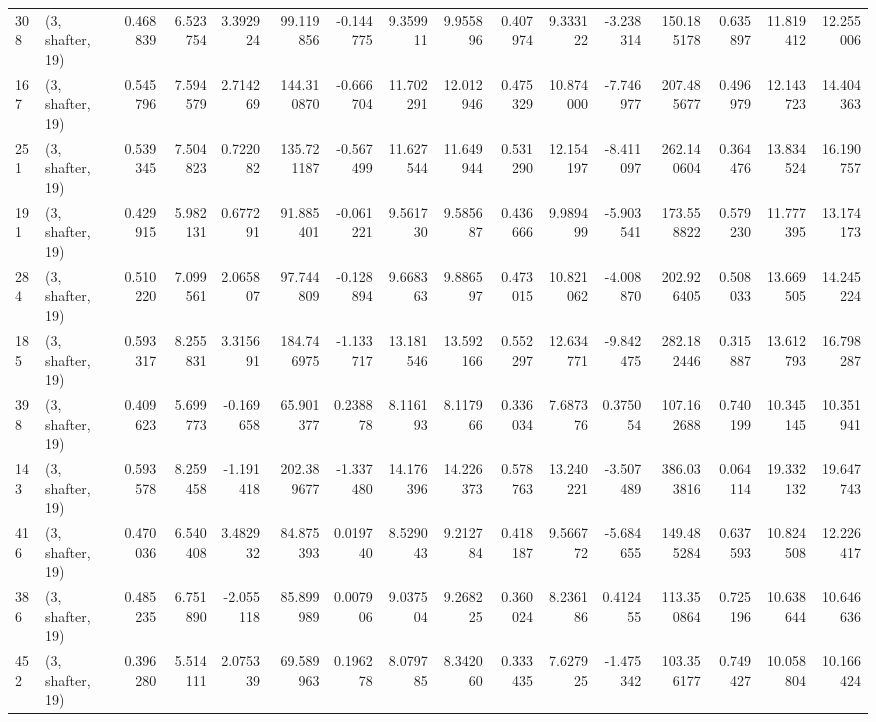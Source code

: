 \begin{tabular}{llrrrrrrrrrrrrrr}
308 &  (3, shafter, 19) &   0.468839 &   6.523754 &   3.392924 &    99.119856 &  -0.144775 &   9.359911 &   9.955896 &  0.407974 &   9.333122 &  -3.238314 &    150.185178 &    0.635897 &   11.819412 &   12.255006 \\
167 &  (3, shafter, 19) &   0.545796 &   7.594579 &   2.714269 &   144.310870 &  -0.666704 &  11.702291 &  12.012946 &  0.475329 &  10.874000 &  -7.746977 &    207.485677 &    0.496979 &   12.143723 &   14.404363 \\
251 &  (3, shafter, 19) &   0.539345 &   7.504823 &   0.722082 &   135.721187 &  -0.567499 &  11.627544 &  11.649944 &  0.531290 &  12.154197 &  -8.411097 &    262.140604 &    0.364476 &   13.834524 &   16.190757 \\
191 &  (3, shafter, 19) &   0.429915 &   5.982131 &   0.677291 &    91.885401 &  -0.061221 &   9.561730 &   9.585687 &  0.436666 &   9.989499 &  -5.903541 &    173.558822 &    0.579230 &   11.777395 &   13.174173 \\
284 &  (3, shafter, 19) &   0.510220 &   7.099561 &   2.065807 &    97.744809 &  -0.128894 &   9.668363 &   9.886597 &  0.473015 &  10.821062 &  -4.008870 &    202.926405 &    0.508033 &   13.669505 &   14.245224 \\
185 &  (3, shafter, 19) &   0.593317 &   8.255831 &   3.315691 &   184.746975 &  -1.133717 &  13.181546 &  13.592166 &  0.552297 &  12.634771 &  -9.842475 &    282.182446 &    0.315887 &   13.612793 &   16.798287 \\
398 &  (3, shafter, 19) &   0.409623 &   5.699773 &  -0.169658 &    65.901377 &   0.238878 &   8.116193 &   8.117966 &  0.336034 &   7.687376 &   0.375054 &    107.162688 &    0.740199 &   10.345145 &   10.351941 \\
143 &  (3, shafter, 19) &   0.593578 &   8.259458 &  -1.191418 &   202.389677 &  -1.337480 &  14.176396 &  14.226373 &  0.578763 &  13.240221 &  -3.507489 &    386.033816 &    0.064114 &   19.332132 &   19.647743 \\
416 &  (3, shafter, 19) &   0.470036 &   6.540408 &   3.482932 &    84.875393 &   0.019740 &   8.529043 &   9.212784 &  0.418187 &   9.566772 &  -5.684655 &    149.485284 &    0.637593 &   10.824508 &   12.226417 \\
386 &  (3, shafter, 19) &   0.485235 &   6.751890 &  -2.055118 &    85.899989 &   0.007906 &   9.037504 &   9.268225 &  0.360024 &   8.236186 &   0.412455 &    113.350864 &    0.725196 &   10.638644 &   10.646636 \\
452 &  (3, shafter, 19) &   0.396280 &   5.514111 &   2.075339 &    69.589963 &   0.196278 &   8.079785 &   8.342060 &  0.333435 &   7.627925 &  -1.475342 &    103.356177 &    0.749427 &   10.058804 &   10.166424 \\

\end{tabular}
